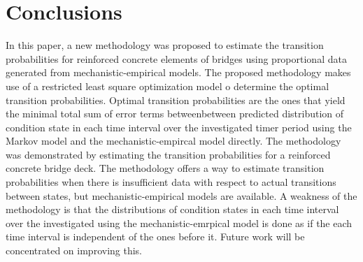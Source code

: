 \documentclass[Journal]{ascelike}
\begin{document}
\section{Conclusions}

\label{conclusion} In this paper, a new methodology was proposed
to estimate the transition probabilities for reinforced concrete elements
of bridges using proportional data generated from mechanistic-empirical
models. The proposed methodology makes use of a restricted least square
optimization model o determine the optimal transition probabilities.
Optimal transition probabilities are the ones that yield the minimal
total sum of error terms betweenbetween predicted distribution of
condition state in each time interval over the investigated timer
period using the Markov model and the mechanistic-empircal model directly.
The methodology was demonstrated by estimating the transition probabilities
for a reinforced concrete bridge deck. The methodology offers a way
to estimate transition probabilities when there is insufficient data
with respect to actual transitions between states, but mechanistic-empirical
models are available. A weakness of the methodology is that the distributions
of condition states in each time interval over the investigated using
the mechanistic-emrpical model is done as if the each time interval
is independent of the ones before it. Future work will be concentrated
on improving this.

\end{document}

